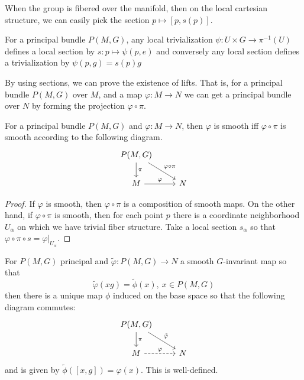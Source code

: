 		When the group is fibered over the manifold, then on the local cartesian structure, we can easily pick the section $p \mapsto [p,s(p)]$.
		
		\begin{prop}
			For a principal bundle $P(M,G)$, any local trivialization $\psi: U \times G \rightarrow \pi^{-1} (U)$ defines a local section by $s: p \mapsto \psi(p, e)$ and conversely any local section defines a trivialization by $\psi(p,g) = s(p) g$
		\end{prop}
		
		By using sections, we can prove the existence of lifts. That is, for a principal bundle $P(M,G)$ over $M$, and a map $\varphi: M \to N$ we can get a principal bundle over $N$ by forming the projection $\varphi \circ \pi$.
		
		\begin{prop}
			For a principal bundle $P(M,G)$ and $\varphi: M \rightarrow N$, then $\varphi$ is smooth iff $\varphi \circ \pi$ is smooth according to the following diagram.
			\[
			\begin{tikzcd}
				P(M,G) \arrow{d}{\pi} \arrow{rd}{\varphi \circ \pi}\\
				M \arrow{r}{\varphi} & N
			\end{tikzcd}
			\]
		\end{prop}
		\begin{proof}
			If $\varphi$ is smooth, then $\varphi \circ \pi$ is a composition of smooth maps. On the other hand, if $\varphi \circ \pi$ is smooth, then for each point $p$ there is a coordinate neighborhood $U_\alpha$ on which we have trivial fiber structure. Take a local section $s_\alpha$ so that $\varphi \circ \pi \circ s = \varphi|_{U_\alpha}$.
		\end{proof}
		
		\begin{prop}
			For $P(M,G)$ principal and $\tilde \varphi: P(M,G) \rightarrow N$ a smooth $G$-invariant map so that 
			\begin{equation}
				\tilde \varphi(x g) = \tilde \phi (x), ~ x \in P(M,G)
			\end{equation}
			then there is a unique map $\phi$ induced on the base space so that the following diagram commutes:
			\[
			\begin{tikzcd}
				P(M,G) \arrow{d}{\pi} \arrow{rd}{\tilde \varphi}\\
				M \arrow[r,dashed, "\varphi"] & N
			\end{tikzcd}
			\]
			and is given by $\tilde \phi([x, g]) = \varphi(x)$. This is well-defined.
		\end{prop}
		
